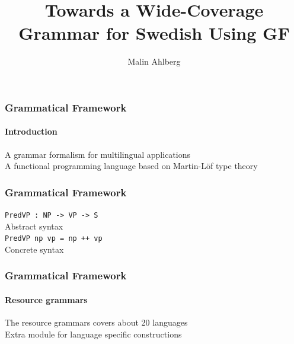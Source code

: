 \documentclass[10pt]{beamer}
\title{Towards a Wide-Coverage Grammar for Swedish Using GF}
\author{Malin Ahlberg}
\date{}
\begin{document}
\maketitle

 \begin{frame}
  \frametitle{Grammatical Framework}
  \framesubtitle{Introduction}
  A grammar formalism for multilingual applications\\
  \pause
  \vspace{5mm}
  A functional programming language  based on Martin-Löf type theory\\
 \end{frame}


\begin{frame}[containsverbatim]
  \frametitle{Grammatical Framework}
  \verb|PredVP : NP -> VP -> S|\\
  Abstract syntax\\
  \vspace{5mm}
  \verb|PredVP np vp = np ++ vp |\\
  Concrete syntax
 \end{frame}


 \begin{frame}
  \frametitle{Grammatical Framework}
  \framesubtitle{Resource grammars}
  The resource grammars covers about 20 languages \\
  \vspace{5mm}
  \pause
  Extra module for language specific constructions
 \end{frame}
\end{document}
